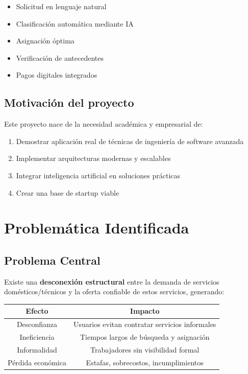 \documentclass[12pt,a4paper,spanish]{article}
\begin{document}
\begin{itemize}
    \item Solicitud en lenguaje natural
    \item Clasificación automática mediante IA
    \item Asignación óptima
    \item Verificación de antecedentes
    \item Pagos digitales integrados
\end{itemize}

\subsection{Motivación del proyecto}

Este proyecto nace de la necesidad académica y empresarial de:

\begin{enumerate}
    \item Demostrar aplicación real de técnicas de ingeniería de software avanzada
    \item Implementar arquitecturas modernas y escalables
    \item Integrar inteligencia artificial en soluciones prácticas
    \item Crear una base de startup viable
\end{enumerate}

\newpage

\section{Problemática Identificada}

\subsection{Problema Central}

Existe una \textbf{desconexión estructural} entre la demanda de servicios domésticos/técnicos y la oferta confiable de estos servicios, generando:

\begin{center}
\begin{tabular}{|c|c|}
    \toprule
    \textbf{Efecto} & \textbf{Impacto} \\
    \midrule
    Desconfianza & Usuarios evitan contratar servicios informales \\
    Ineficiencia & Tiempos largos de búsqueda y asignación \\
    Informalidad & Trabajadores sin visibilidad formal \\
    Pérdida económica & Estafas, sobrecostos, incumplimientos \\
    \bottomrule
\end{tabular}
\end{center}
\end{document}
